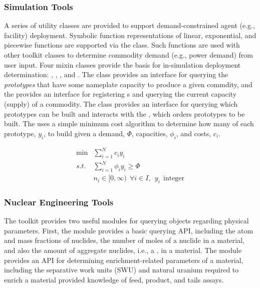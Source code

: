 \subsubsection{Simulation Tools}

A series of utility classes are provided to support demand-constrained agent
(e.g., facility) deployment. Symbolic function representations of linear,
exponential, and piecewise functions are supported via the
 class. Such functions are used with other toolkit
classes to determine commodity demand (e.g., power demand) from user input. Four
mixin classes provide the basis for in-simulation deployment determination:
, , ,
and . The  class provides an
interface for querying the \textit{prototypes} that have some nameplate
capacity to produce a given commdity, and the 
provides an interface for registering s and querying
the current capacity (supply) of a commodity. The  class provides
an interface for querying which prototypes can be built and interacts with the
, which orders prototypes to be built. The
 uses a simple minimum cost algorithm to determine how
many of each prototype, $y_i$, to build given a demand, $\Phi$, capacities,
$\phi_i$, and costs, $c_i$.

\begin{equation}
\begin{aligned}
 \min & \sum_{i=1}^{N}c_i y_i \\
 s.t. & \sum_{i=1}^{N}\phi_i y_i \ge \Phi \\
      & n_i \in [0,\infty) \:\: \forall i \in I, \:\: y_i \:\: \text{integer} 
\end{aligned}
\end{equation}

\subsubsection{Nuclear Engineering Tools}

The \Cyclus toolkit provides two useful modules for querying 
objects regarding physical parameters. First, the  module
provides a basic querying \gls{API}, including the atom and mass fractions of
nuclides, the number of moles of a nuclide in a material, and also the amount of
aggregate nuclides, i.e., a , in a material. The
 module provides an \gls{API} for determining enrichment-related
parameters of a material, including the separative work units (SWU) and natural
uranium required to enrich a material provided knowledge of feed, product, and tails
assays.

